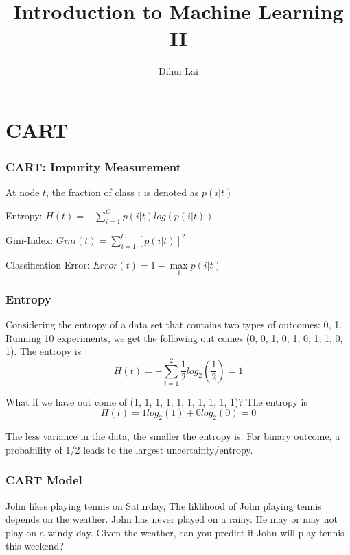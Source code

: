 \documentclass[notheorems, aspectratio=54]{beamer}
\title{Introduction to Machine Learning II}
\author{Dihui Lai}
\institute[WUSTL]{dlai@wustl.edu}
\begin{document}
\begin{frame}
    \titlepage
\end{frame}

\section{CART}
\begin{frame}
    \frametitle{CART: Impurity Measurement}
    At node $t$, the fraction of class $i$ is denoted as $p(i|t)$
    
    Entropy: $H(t)=-\sum\limits_{i=1}^{C}p(i|t)log(p(i|t))$
    
    Gini-Index: $Gini(t)=\sum\limits_{i=1}^{C}[p(i|t)]^2$
    
    Classification Error: $Error(t)=1-\max\limits_{i}p(i| t)$
\end{frame}

\begin{frame}
    \frametitle{Entropy}
    Considering the entropy of a data set that contains two types of outcomes: {0, 1}. Running 10 experiments, we get the following out comes (0, 0, 1, 0, 1, 0, 1, 1, 0, 1). The entropy is 
    $$
    H(t)=-\sum\limits_{i=1}^{2}\frac{1}{2}log_2(\frac{1}{2})=1
    $$
    
What if we have out come of (1, 1, 1, 1, 1, 1, 1, 1, 1, 1)? The entropy is 
    $$
    H(t)=1log_2(1)+0log_2(0)=0
    $$

The less variance in the data, the smaller the entropy is. For binary outcome, a probability of 1/2 leads to the largest uncertainty/entropy.

\end{frame}

\begin{frame}
\frametitle{CART Model}
John likes playing tennis on Saturday, The liklihood of John playing tennis depends on the weather. John has never played on a rainy. He may or may not play on a windy day. Given the weather, can you predict if John will play tennis this weekend?

\begin{center}
\end{center}
\end{frame}
\end{document}
